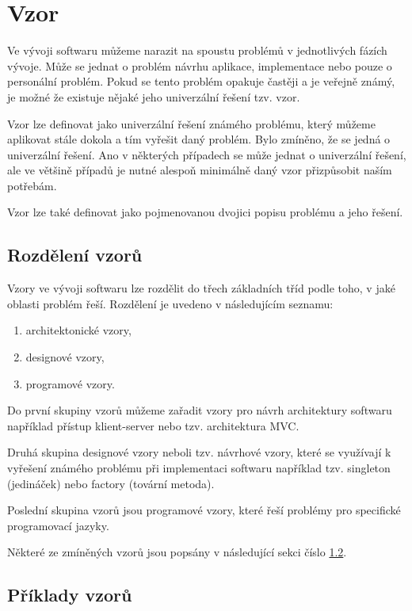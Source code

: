 \documentclass[czech,DP]{thesiskiv}
\begin{document}
\section{Vzor}\label{sec:pattern}
Ve vývoji softwaru můžeme narazit na spoustu problémů v jednotlivých fázích vývoje. Může se jednat o problém návrhu aplikace, implementace nebo pouze o personální problém. Pokud se tento problém opakuje častěji a je veřejně známý, je možné že existuje nějaké jeho univerzální řešení tzv. vzor. 
\par
Vzor lze definovat jako univerzální řešení známého problému, který můžeme aplikovat stále dokola a tím vyřešit daný problém. Bylo zmíněno, že se jedná o univerzální řešení. Ano v některých případech se může jednat o univerzální řešení, ale ve většině případů je nutné alespoň minimálně daný vzor přizpůsobit naším potřebám.
\par
Vzor lze také definovat jako pojmenovanou dvojici popisu problému a jeho řešení. \cite{antipatterns}

\subsection{Rozdělení vzorů}
Vzory ve vývoji softwaru lze rozdělit do třech základních tříd podle toho, v jaké oblasti problém řeší. Rozdělení je uvedeno v následujícím seznamu:
\begin{enumerate}
    \item architektonické vzory,
    \item designové vzory,
    \item programové vzory.\cite{patterns_classes}
\end{enumerate}
Do první skupiny vzorů můžeme zařadit vzory pro návrh architektury softwaru například přístup klient-server nebo tzv. architektura MVC.
\par
Druhá skupina designové vzory neboli tzv. návrhové vzory, které se využívají k vyřešení známého problému při implementaci softwaru například tzv. singleton (jedináček) nebo factory (tovární metoda).
\par
Poslední skupina vzorů jsou programové vzory, které řeší problémy pro specifické programovací jazyky.
\par
Některé ze zmíněných vzorů jsou popsány v následující sekci číslo \ref{sec:pattern_example}.
\subsection{Příklady vzorů}\label{sec:pattern_example}
\end{document}
